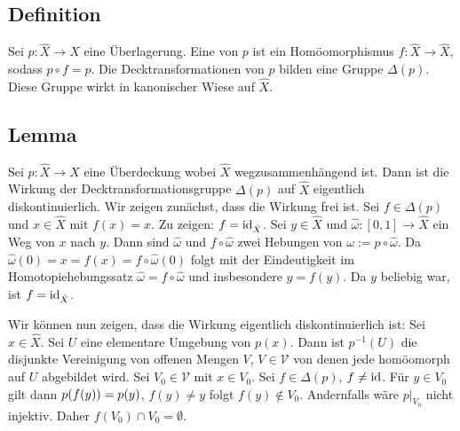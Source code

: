 \subsection[Definition: Decktransformation]{Definition} %
\label{sub:12.6}
Sei $p : \hat{X} \to X$ eine Überlagerung. Eine  von $p$ ist ein Homöomorphismus $f : \hat{X} \to \hat{X}$, sodass $p \circ f = p$. Die 
Decktransformationen von $p$ bilden eine Gruppe $\Delta(p)$. Diese Gruppe wirkt in kanonischer Wiese auf $\hat{X}$.

\subsection{Lemma} %
\label{sub:12.7}
Sei $p : \hat{X} \to X$ eine Überdeckung wobei $\hat{X}$ wegzusammenhängend ist. Dann ist die Wirkung der Decktransformationsgruppe $\Delta(p)$ auf $\hat{X}$ eigentlich
diskontinuierlich.
Wir zeigen zunächst, dass die Wirkung frei ist. Sei $f \in \Delta(p)$ und $x \in \hat{X}$ mit $f(x) = x$. Zu zeigen: $f =\operatorname{id}_{\hat{X}}$.
Sei $y \in \hat{X}$ und $\hat{\omega} : [0,1] \to \hat{X}$ ein
Weg von $x$ nach $y$. Dann sind $\hat{\omega}$ und $f \circ \hat{\omega}$ zwei Hebungen von $\omega := p \circ \hat{\omega}$. Da 
$\hat{\omega}(0) = x = f(x) = f \circ \hat{\omega}(0)$ folgt mit der Eindeutigkeit im Homotopiehebungssatz $\hat{\omega} = f \circ \hat{\omega}$ und insbesondere $y=f(y)$.
Da $y$ beliebig war, ist $f= \operatorname{id}_{\hat{X}}$.

Wir können nun zeigen, dass die Wirkung eigentlich diskontinuierlich ist: Sei $x \in \hat{X}$. Sei $U$ eine elementare Umgebung von $p(x)$. Dann ist $p ^{-1}(U)$ die 
disjunkte Vereinigung von offenen Mengen $V$, $V \in \mathcal{V}$ von denen jede homöomorph auf $U$ abgebildet wird. Sei $V_0 \in \mathcal{V}$ mit $x \in V_0$. Sei 
$f \in \Delta(p)$, $f \not= \operatorname{id}$. Für $y \in V_0$ gilt dann $p \enbrace*{f(y)} = p(y) $, $f(y) \not=y$ folgt $f(y) \not\in V_0$. Andernfalls wäre $p\big|_{V_0}$ nicht
injektiv. Daher $f(V_0) \cap V_0 = \emptyset$. \bewende

